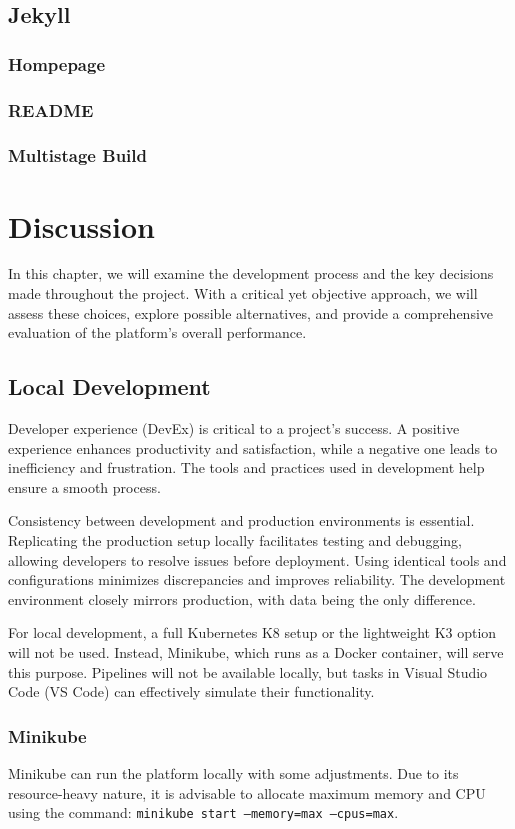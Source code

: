 \section{Jekyll}
\subsection{Hompepage}
\subsection{README}
\subsection{Multistage Build}

\chapter{Discussion}
In this chapter, we will examine the development process and the key decisions made throughout the project. With a critical yet objective approach, we will assess these choices, explore possible alternatives, and provide a comprehensive evaluation of the platform's overall performance.

\section{Local Development}
Developer experience (DevEx) is critical to a project's success. A positive experience enhances productivity and satisfaction, while a negative one leads to inefficiency and frustration. The tools and practices used in development help ensure a smooth process.

Consistency between development and production environments is essential. Replicating the production setup locally facilitates testing and debugging, allowing developers to resolve issues before deployment. Using identical tools and configurations minimizes discrepancies and improves reliability. The development environment closely mirrors production, with data being the only difference.

For local development, a full Kubernetes K8 setup or the lightweight K3 option will not be used. Instead, Minikube, which runs as a Docker container, will serve this purpose. Pipelines will not be available locally, but tasks in Visual Studio Code (VS Code) can effectively simulate their functionality.

\subsection{Minikube}
Minikube can run the platform locally with some adjustments. Due to its resource-heavy nature, it is advisable to allocate maximum memory and CPU using the command: \texttt{minikube start --memory=max --cpus=max}.


